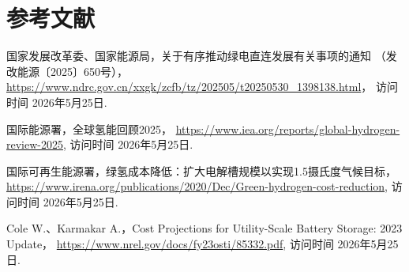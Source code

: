 \section*{参考文献}

\begingroup
\sloppy
\raggedright
\begin{enumerate}[label={[\arabic*]},leftmargin=2.5em]
  \item 国家发展改革委、国家能源局，关于有序推动绿电直连发展有关事项的通知
        （发改能源〔2025〕650号），
        \url{https://www.ndrc.gov.cn/xxgk/zcfb/tz/202505/t20250530_1398138.html}，
        访问时间 2026年5月25日.
  \item 国际能源署，全球氢能回顾2025，
        \url{https://www.iea.org/reports/global-hydrogen-review-2025},
        访问时间 2026年5月25日.
  \item 国际可再生能源署，绿氢成本降低：扩大电解槽规模以实现1.5摄氏度气候目标，
        \url{https://www.irena.org/publications/2020/Dec/Green-hydrogen-cost-reduction},
        访问时间 2026年5月25日.
  \item Cole W.、Karmakar A.，Cost Projections for Utility-Scale
Battery Storage: 2023 Update，
        \url{https://www.nrel.gov/docs/fy23osti/85332.pdf},
        访问时间 2026年5月25日.
\end{enumerate}
\endgroup
